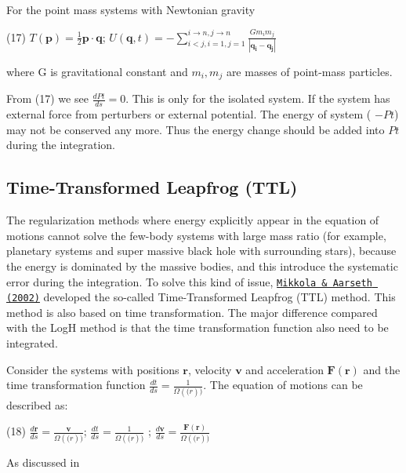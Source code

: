For the point mass systems with Newtonian gravity

(17) $ T(\mathbf{p}) = \frac{1}{2} \mathbf{p} \cdot \mathbf{q} $; $ U(\mathbf{q},t) = - \sum_{i<j,i=1,j=1}^{i\rightarrow n,j\rightarrow n} \frac{G m_i m_j}{|\mathbf{q_i}-\mathbf{q_j}|} $

where G is gravitational constant and $ m_i, m_j $ are masses of point-\/mass particles.

From (17) we see $ \frac{d Pt}{d s} = 0 $. This is only for the isolated system. If the system has external force from perturbers or external potential. The energy of system ( $-Pt$) may not be conserved any more. Thus the energy change should be added into $Pt$ during the integration.\hypertarget{index_TTL_sec}{}\subsection{Time-\/\+Transformed Leapfrog (\+T\+T\+L)}\label{index_TTL_sec}
The regularization methods where energy explicitly appear in the equation of motions cannot solve the few-\/body systems with large mass ratio (for example, planetary systems and super massive black hole with surrounding stars), because the energy is dominated by the massive bodies, and this introduce the systematic error during the integration. To solve this kind of issue, \href{http://adsabs.harvard.edu/abs/2002CeMDA..84..343M}{\tt Mikkola \& Aarseth (2002)} developed the so-\/called Time-\/\+Transformed Leapfrog (T\+TL) method. This method is also based on time transformation. The major difference compared with the LogH method is that the time transformation function also need to be integrated.

Consider the systems with positions $\mathbf{r}$, velocity $\mathbf{v}$ and acceleration $\mathbf{F}(\mathbf{r})$ and the time transformation function $ \frac{d t}{d s} = \frac{1}{\Omega(\mathbf(r))} $. The equation of motions can be described as\+:

(18) $ \frac{d \mathbf{r}} {d s} = \frac{\mathbf{v}}{\Omega(\mathbf(r))} $; $ \frac{d t}{d s} = \frac{1}{\Omega(\mathbf(r))}$ ; $ \frac{d \mathbf{v}}{d s} = \frac{\mathbf{F}(\mathbf{r})}{\Omega(\mathbf(r))} $

As discussed in 